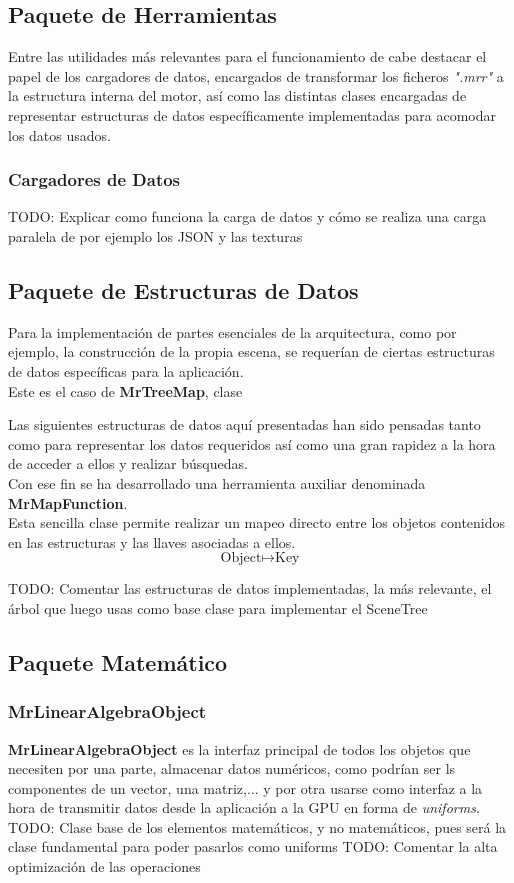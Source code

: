 \subsection{Paquete de Herramientas}
Entre las utilidades más relevantes para el funcionamiento de \robotto cabe destacar el papel de los cargadores de datos, encargados de transformar los ficheros \textit{".mrr"} a la estructura interna del motor, así como las distintas clases encargadas de representar estructuras de datos específicamente implementadas para acomodar los datos usados.

\subsubsection{Cargadores de Datos}
TODO: Explicar como funciona la carga de datos y cómo se realiza una carga paralela de por ejemplo los JSON y las texturas

\subsection{Paquete de Estructuras de Datos}
Para la implementación de partes esenciales de la arquitectura, como por ejemplo, la construcción de la propia escena, se requerían de ciertas estructuras de datos específicas para la aplicación.\\
Este es el caso de \textbf{MrTreeMap}, clase 

Las siguientes estructuras de datos aquí presentadas han sido pensadas tanto como para representar los datos requeridos así como una gran rapidez a la hora de acceder a ellos y realizar búsquedas.\\
Con ese fin se ha desarrollado una herramienta auxiliar denominada \textbf{MrMapFunction}.\\
Esta sencilla clase permite realizar un mapeo directo entre los objetos contenidos en las estructuras y las llaves asociadas a ellos.
$$\text{Object}\mapsto \text{Key}$$


TODO: Comentar las estructuras de datos implementadas, la más relevante, el árbol que luego usas como base clase para implementar el SceneTree

\subsection{Paquete Matemático}
\subsubsection{MrLinearAlgebraObject}
\textbf{MrLinearAlgebraObject} es la interfaz principal de todos los objetos que necesiten por una parte, almacenar datos numéricos, como podrían ser ls componentes de un vector, una matriz,... y por otra usarse como interfaz a la hora de transmitir datos desde la aplicación a la GPU en forma de \textit{uniforms}.
TODO: Clase base de los elementos matemáticos, y no matemáticos, pues será la clase fundamental para poder pasarlos como uniforms
TODO: Comentar la alta optimización de las operaciones
